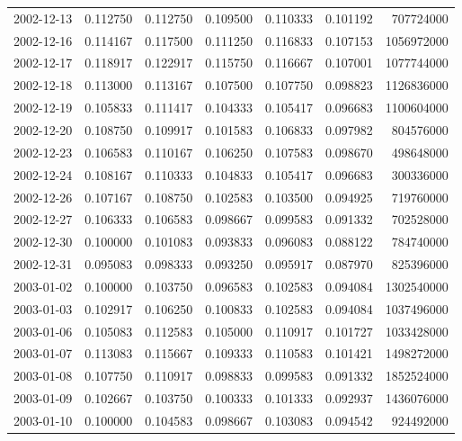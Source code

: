\begin{tabular}{lrrrrrr}
2002-12-13 &    0.112750 &    0.112750 &    0.109500 &    0.110333 &    0.101192 &   707724000 \\
2002-12-16 &    0.114167 &    0.117500 &    0.111250 &    0.116833 &    0.107153 &  1056972000 \\
2002-12-17 &    0.118917 &    0.122917 &    0.115750 &    0.116667 &    0.107001 &  1077744000 \\
2002-12-18 &    0.113000 &    0.113167 &    0.107500 &    0.107750 &    0.098823 &  1126836000 \\
2002-12-19 &    0.105833 &    0.111417 &    0.104333 &    0.105417 &    0.096683 &  1100604000 \\
2002-12-20 &    0.108750 &    0.109917 &    0.101583 &    0.106833 &    0.097982 &   804576000 \\
2002-12-23 &    0.106583 &    0.110167 &    0.106250 &    0.107583 &    0.098670 &   498648000 \\
2002-12-24 &    0.108167 &    0.110333 &    0.104833 &    0.105417 &    0.096683 &   300336000 \\
2002-12-26 &    0.107167 &    0.108750 &    0.102583 &    0.103500 &    0.094925 &   719760000 \\
2002-12-27 &    0.106333 &    0.106583 &    0.098667 &    0.099583 &    0.091332 &   702528000 \\
2002-12-30 &    0.100000 &    0.101083 &    0.093833 &    0.096083 &    0.088122 &   784740000 \\
2002-12-31 &    0.095083 &    0.098333 &    0.093250 &    0.095917 &    0.087970 &   825396000 \\
2003-01-02 &    0.100000 &    0.103750 &    0.096583 &    0.102583 &    0.094084 &  1302540000 \\
2003-01-03 &    0.102917 &    0.106250 &    0.100833 &    0.102583 &    0.094084 &  1037496000 \\
2003-01-06 &    0.105083 &    0.112583 &    0.105000 &    0.110917 &    0.101727 &  1033428000 \\
2003-01-07 &    0.113083 &    0.115667 &    0.109333 &    0.110583 &    0.101421 &  1498272000 \\
2003-01-08 &    0.107750 &    0.110917 &    0.098833 &    0.099583 &    0.091332 &  1852524000 \\
2003-01-09 &    0.102667 &    0.103750 &    0.100333 &    0.101333 &    0.092937 &  1436076000 \\
2003-01-10 &    0.100000 &    0.104583 &    0.098667 &    0.103083 &    0.094542 &   924492000 \\

\end{tabular}
